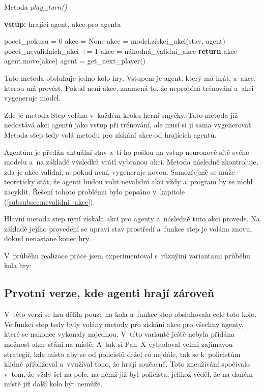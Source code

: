 \begin{algorithm}[H]
  \caption{Metoda \emph{play\_turn()}}
  \label{alg:play_turn}
  \begin{algorithmic}
    \State \textbf{vstup:} hrající agent, akce pro agenta
    \State

      \State pocet\_pokusu = 0
      \State akce = None
          \State akce = model.získej\_akci(stav, agent)
          \State pocet\_nevalidnich\_akci += 1
        \Else
        \State akce = náhodná\_validní\_akce
        \EndIf
      \EndWhile
      \State \textbf{return} akce
    \EndIf
    \State agent.move(akce)
    \State agent = get\_next\_player()
  \end{algorithmic}
\end{algorithm}

Tato metoda obsluhuje jedno kolo hry.
Vstupem je agent, který má hrát, a~akce, kterou má provést.
Pokud není akce, znamená to, že neprobíhá trénování a~akci vygeneruje model.

Zde je metoda Step volána v~každém kroku  herní smyčky.
Tato metoda již nedostává akci agentů jako vstup při trénování, ale musí si ji sama vygenerovat.
Metoda step tedy volá metodu pro získání akce od hrajících agentů.

Agentům je předán aktuální stav a~ti ho pošlou na vstup neuronové sítě svého modelu a~na základě výsledků vrátí vybranou akci.
Metoda následně zkontroluje, zda je akce validní, a~pokud není, vygeneruje novou.
Samozřejmě se může teoreticky stát, že agenti budou volit nevalidní akci vždy a~program by se mohl zacyklit.
Řešení tohoto problému bylo popsáno v~kapitole  (\ref{subsubsec:nevalidni_akce}).

Hlavní metoda step nyní získala akci pro agenty a~následně tuto akci provede.
Na základě jejího provedení se upraví stav prostředí a~funkce step je volána znovu, dokud nenastane konec hry.


V~průběhu realizace práce jsem experimentoval s~různými variantami průběhu kola hry:
\subsection{Prvotní verze, kde agenti hrají zároveň}
V~této verzi se hra dělila pouze na kola a~funkce step obsluhovala celé toto kolo.
Ve funkci step tedy byly volány metody pro získání akce pro všechny agenty, které se nakonec vykonaly najednou.
V~této variantě ještě nebyla přidána možnost akce stání na místě.
A~tak si Pan~X vybudoval velmi zajímavou strategii, kde místo aby se od policistů držel co nejdále, tak se k~policistům klidně přibližoval a~využíval toho, že hrají současně.
Toto zneužívání spočívalo v~tom, že vždy šel na pole, na němž již byl policista, jelikož věděl, že na daném místě již další kolo být nemůže.

